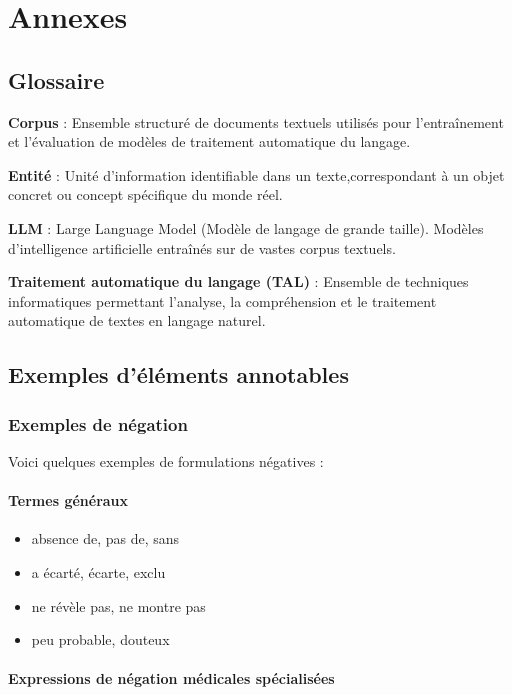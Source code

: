 \chapter{Annexes}

\section{Glossaire}

\textbf{Corpus} : Ensemble structuré de documents textuels utilisés pour l'entraînement et l'évaluation de modèles de traitement automatique du langage.

\textbf{Entité} : Unité d'information identifiable dans un texte,correspondant à un objet concret ou concept spécifique du monde réel.

\textbf{LLM} : Large Language Model (Modèle de langage de grande taille). Modèles d'intelligence artificielle entraînés sur de vastes corpus textuels.

\textbf{Traitement automatique du langage (TAL)} : Ensemble de techniques informatiques permettant l'analyse, la compréhension et le traitement automatique de textes en langage naturel.

\section{Exemples d'éléments annotables}

\subsection{Exemples de négation}
\label{sec:negation}

Voici quelques exemples de formulations négatives :

\subsubsection{Termes généraux}

\begin{itemize}
    \item absence de, pas de, sans
    \item a écarté, écarte, exclu
    \item ne révèle pas, ne montre pas
    \item peu probable, douteux
\end{itemize}

\subsubsection{Expressions de négation médicales spécialisées}

